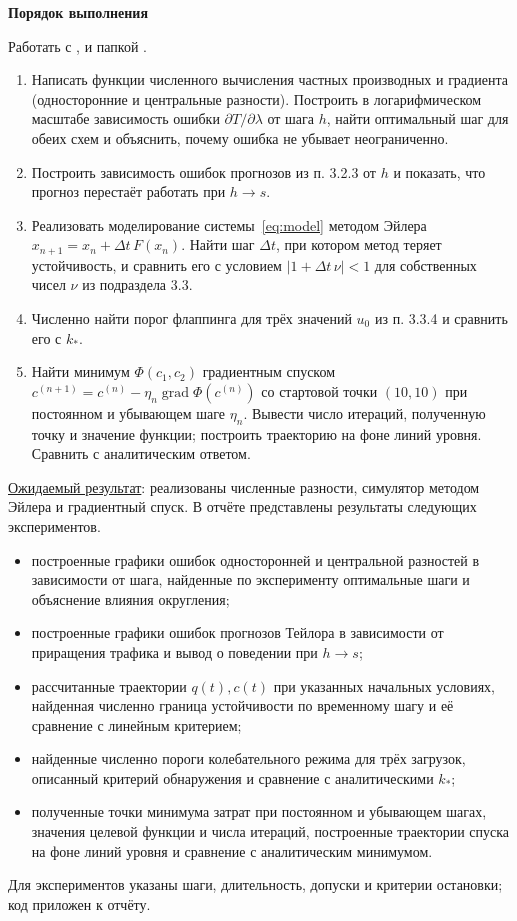 \documentclass[12pt,a4paper]{article}
\newcommand{\taskhead}[1]{\par\textbf{#1}\par}
\begin{document}
\taskhead{Порядок выполнения}
Работать с ,  и папкой .
\begin{enumerate}
\item Написать функции численного вычисления частных производных и градиента
(односторонние и центральные разности). Построить в логарифмическом масштабе
зависимость ошибки $\partial T/\partial\lambda$ от шага $h$, найти оптимальный
шаг для обеих схем и объяснить, почему ошибка не убывает неограниченно.
\item Построить зависимость ошибок прогнозов из п. 3.2.3 от $h$ и показать,
что прогноз перестаёт работать при $h\to s$.
\item Реализовать моделирование системы~\eqref{eq:model} методом Эйлера
$x_{n+1}=x_n+\Delta t\,F(x_n)$. Найти шаг $\Delta t$, при котором метод теряет
устойчивость, и сравнить его с условием $|1+\Delta t\,\nu|<1$
для собственных чисел $\nu$ из подраздела 3.3.
\item Численно найти порог флаппинга для трёх значений $u_0$ из п. 3.3.4
и сравнить его с $k_*$.
\item Найти минимум $\Phi(c_1,c_2)$ градиентным спуском
$c^{(n+1)}=c^{(n)}-\eta_n\operatorname{grad}\Phi(c^{(n)})$
со стартовой точки $(10,10)$ при постоянном и убывающем шаге $\eta_n$.
Вывести число итераций, полученную точку и значение функции;
построить траекторию на фоне линий уровня. Сравнить с аналитическим ответом.
\end{enumerate}
\underline{Ожидаемый результат}: реализованы численные разности,
симулятор методом Эйлера и градиентный спуск.
В отчёте представлены результаты следующих экспериментов.
\begin{itemize}
\item построенные графики ошибок односторонней и центральной разностей
в зависимости от шага, найденные по эксперименту оптимальные шаги
и объяснение влияния округления;
\item построенные графики ошибок прогнозов Тейлора в зависимости
от приращения трафика и вывод о поведении при $h\to s$;
\item рассчитанные траектории $q(t),c(t)$ при указанных начальных условиях,
найденная численно граница устойчивости по временному шагу
и её сравнение с линейным критерием;
\item найденные численно пороги колебательного режима для трёх загрузок,
описанный критерий обнаружения и сравнение с аналитическими $k_*$;
\item полученные точки минимума затрат при постоянном и убывающем шагах,
значения целевой функции и числа итераций, построенные траектории спуска
на фоне линий уровня и сравнение с аналитическим минимумом.
\end{itemize}
Для экспериментов указаны шаги, длительность, допуски и критерии остановки;
код приложен к отчёту.
\end{document}
